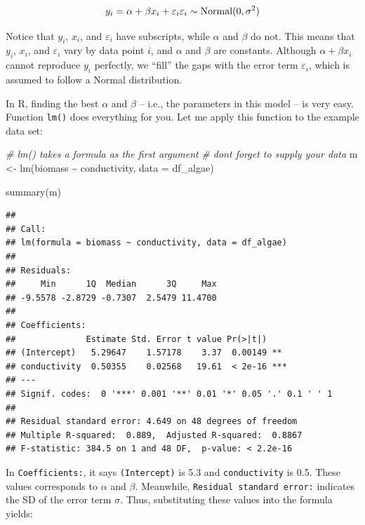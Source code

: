 \documentclass[
]{book}
\newenvironment{Shaded}{\begin{snugshade}}{\end{snugshade}}
\newcommand{\AttributeTok}[1]{\textcolor[rgb]{0.77,0.63,0.00}{#1}}
\newcommand{\CommentTok}[1]{\textcolor[rgb]{0.56,0.35,0.01}{\textit{#1}}}
\newcommand{\FunctionTok}[1]{\textcolor[rgb]{0.00,0.00,0.00}{#1}}
\newcommand{\NormalTok}[1]{#1}
\newcommand{\OtherTok}[1]{\textcolor[rgb]{0.56,0.35,0.01}{#1}}
\newcommand{\SpecialCharTok}[1]{\textcolor[rgb]{0.00,0.00,0.00}{#1}}
\begin{document}
\[
y_i = \alpha + \beta x_i + \varepsilon_i\\
\varepsilon_i \sim \text{Normal}(0, \sigma^2)
\]

Notice that \(y_i\), \(x_i\), and \(\varepsilon_i\) have subscripts, while \(\alpha\) and \(\beta\) do not. This means that \(y_i\), \(x_i\), and \(\varepsilon_i\) vary by data point \(i\), and \(\alpha\) and \(\beta\) are constants. Although \(\alpha + \beta x_i\) cannot reproduce \(y_i\) perfectly, we ``fill'' the gaps with the error term \(\varepsilon_i\), which is assumed to follow a Normal distribution.

In R, finding the best \(\alpha\) and \(\beta\) -- i.e., the parameters in this model -- is very easy. Function \texttt{lm()} does everything for you. Let me apply this function to the example data set:

\begin{Shaded}
\begin{Highlighting}[]
\CommentTok{\# lm() takes a formula as the first argument}
\CommentTok{\# don\textquotesingle{}t forget to supply your data}
\NormalTok{m }\OtherTok{\textless{}{-}} \FunctionTok{lm}\NormalTok{(biomass }\SpecialCharTok{\textasciitilde{}}\NormalTok{ conductivity,}
        \AttributeTok{data =}\NormalTok{ df\_algae)}

\FunctionTok{summary}\NormalTok{(m)}
\end{Highlighting}
\end{Shaded}

\begin{verbatim}
## 
## Call:
## lm(formula = biomass ~ conductivity, data = df_algae)
## 
## Residuals:
##     Min      1Q  Median      3Q     Max 
## -9.5578 -2.8729 -0.7307  2.5479 11.4700 
## 
## Coefficients:
##              Estimate Std. Error t value Pr(>|t|)    
## (Intercept)   5.29647    1.57178    3.37  0.00149 ** 
## conductivity  0.50355    0.02568   19.61  < 2e-16 ***
## ---
## Signif. codes:  0 '***' 0.001 '**' 0.01 '*' 0.05 '.' 0.1 ' ' 1
## 
## Residual standard error: 4.649 on 48 degrees of freedom
## Multiple R-squared:  0.889,  Adjusted R-squared:  0.8867 
## F-statistic: 384.5 on 1 and 48 DF,  p-value: < 2.2e-16
\end{verbatim}

In \texttt{Coefficients:}, it says \texttt{(Intercept)} is 5.3 and \texttt{conductivity} is 0.5. These values corresponds to \(\alpha\) and \(\beta\). Meanwhile, \texttt{Residual\ standard\ error:} indicates the SD of the error term \(\sigma\). Thus, substituting these values into the formula yields:
\end{document}
